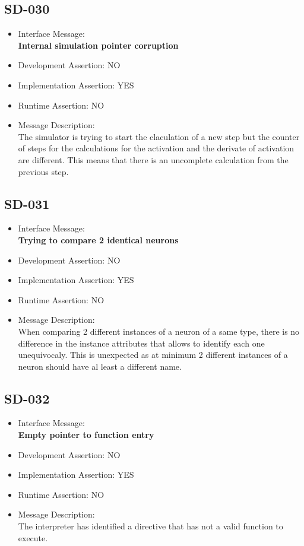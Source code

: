 \subsection{SD-030}
\begin{itemize}
  \item Interface Message:\\[1em]
    \textbf{Internal simulation pointer corruption}
  \item Development Assertion: NO
  \item Implementation Assertion: YES
  \item Runtime Assertion: NO
  \item Message Description:\\[1em]
    The simulator is trying to start the claculation of a new step but the counter of steps for the calculations for the activation and the derivate of activation are different. This means that there is an uncomplete calculation from the previous step.
\end{itemize}

\subsection{SD-031}
\begin{itemize}
  \item Interface Message:\\[1em]
    \textbf{Trying to compare 2 identical neurons}
  \item Development Assertion: NO
  \item Implementation Assertion: YES
  \item Runtime Assertion: NO
  \item Message Description:\\[1em]
    When comparing 2 different instances of a neuron of a same type, there is no difference in the instance attributes that allows to identify each one unequivocaly. This is unexpected as at minimum 2 different instances of a neuron should have al least a different name.
\end{itemize}

\subsection{SD-032}
\begin{itemize}
  \item Interface Message:\\[1em]
    \textbf{Empty pointer to function entry}
  \item Development Assertion: NO
  \item Implementation Assertion: YES
  \item Runtime Assertion: NO
  \item Message Description:\\[1em]
    The interpreter has identified a directive that has not a valid function to execute.
\end{itemize}

